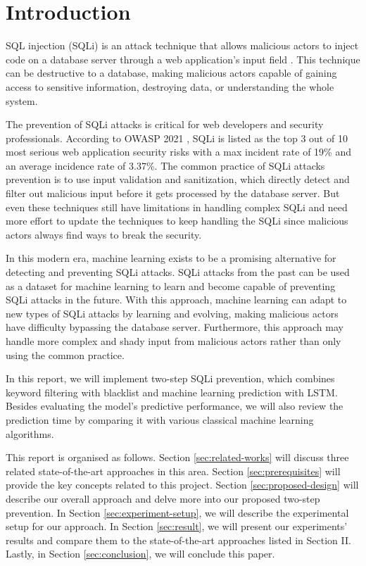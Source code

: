 \section{Introduction}
\label{sec:introduction}

\par SQL injection (SQLi) is an attack technique that allows malicious actors to inject code on a database server through a web application's input field \cite{7395166}. This technique can be destructive to a database, making malicious actors capable of gaining access to sensitive information, destroying data, or understanding the whole system.
\par The prevention of SQLi attacks is critical for web developers and security professionals. According to OWASP 2021 \cite{OWASP}, SQLi is listed as the top 3 out of 10 most serious web application security risks with a max incident rate of 19\% and an average incidence rate of 3.37\%. The common practice of SQLi attacks prevention is to use input validation and sanitization, which directly detect and filter out malicious input before it gets processed by the database server. But even these techniques still have limitations in handling complex SQLi and need more effort to update the techniques to keep handling the SQLi since malicious actors always find ways to break the security.

\par In this modern era, machine learning exists to be a promising alternative for detecting and preventing SQLi attacks. SQLi attacks from the past can be used as a dataset for machine learning to learn and become capable of preventing SQLi attacks in the future. With this approach, machine learning can adapt to new types of SQLi attacks by learning and evolving, making malicious actors have difficulty bypassing the database server. Furthermore, this approach may handle more complex and shady input from malicious actors rather than only using the common practice.

\par In this report, we will implement two-step SQLi prevention, which combines keyword filtering with blacklist and machine learning prediction with LSTM. Besides evaluating the model's predictive performance, we will also review the prediction time by comparing it with various classical machine learning algorithms.

\par This report is organised as follows. Section \ref{sec:related-works} will discuss three related state-of-the-art approaches in this area. Section \ref{sec:prerequisites} will provide the key concepts related to this project. Section \ref{sec:proposed-design} will describe our overall approach and delve more into our proposed two-step prevention. In Section \ref{sec:experiment-setup}, we will describe the experimental setup for our approach. In Section \ref{sec:result}, we will present our experiments' results and compare them to the state-of-the-art approaches listed in Section II. Lastly, in Section \ref{sec:conclusion}, we will conclude this paper.